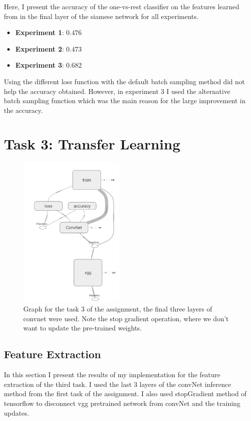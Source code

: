 \documentclass{article}
\begin{document}
Here, I present the accuracy of the one-vs-rest classifier on the features learned from in the final layer of the siamese network for all experiments.

\begin{itemize}
\item \textbf{Experiment 1}: $0.476$
\item \textbf{Experiment 2}: $0.473$
\item \textbf{Experiment 3}: $\mathbf{0.682}$
\end{itemize}

Using the different loss function with the default batch sampling method did not help the accuracy obtained.
However, in experiment 3 I used the alternative batch sampling function which was the main reason for the large improvement in the accuracy.




\clearpage

\section{Task 3: Transfer Learning}
 
 
\begin{figure}[h!]
\centering
\includegraphics[width=5.2cm]{graph.png}
\caption{Graph for the task 3 of the assignment, the final three layers of convnet were used. Note the stop gradient operation, where we don't want to update the pre-trained weights.}
\label{fig:graph}
\end{figure}

\subsection{Feature Extraction}

In this section I present the results of my implementation for the feature extraction of the third task.
I used the last 3 layers of the convNet inference method from the first task of the assignment.
I also used stopGradient method of tensorflow to disconnect vgg pretrained network from convNet and the training updates.
\end{document}
